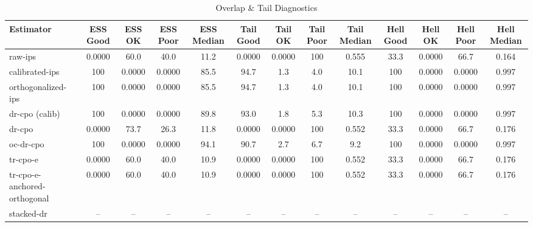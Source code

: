 \begin{table}[htbp]
\centering
\caption{Overlap & Tail Diagnostics}
\label{tab:A3}
\begin{tabular}{l|cccccccccccc}
\toprule
Estimator & ESS Good & ESS OK & ESS Poor & ESS Median & Tail Good & Tail OK & Tail Poor & Tail Median & Hell Good & Hell OK & Hell Poor & Hell Median \\
\midrule
raw-ips & 0.0000 & 60.0 & 40.0 & 11.2 & 0.0000 & 0.0000 & 100 & 0.555 & 33.3 & 0.0000 & 66.7 & 0.164 \\
calibrated-ips & 100 & 0.0000 & 0.0000 & 85.5 & 94.7 & 1.3 & 4.0 & 10.1 & 100 & 0.0000 & 0.0000 & 0.997 \\
orthogonalized-ips & 100 & 0.0000 & 0.0000 & 85.5 & 94.7 & 1.3 & 4.0 & 10.1 & 100 & 0.0000 & 0.0000 & 0.997 \\
dr-cpo (calib) & 100 & 0.0000 & 0.0000 & 89.8 & 93.0 & 1.8 & 5.3 & 10.3 & 100 & 0.0000 & 0.0000 & 0.997 \\
dr-cpo & 0.0000 & 73.7 & 26.3 & 11.8 & 0.0000 & 0.0000 & 100 & 0.552 & 33.3 & 0.0000 & 66.7 & 0.176 \\
oc-dr-cpo & 100 & 0.0000 & 0.0000 & 94.1 & 90.7 & 2.7 & 6.7 & 9.2 & 100 & 0.0000 & 0.0000 & 0.997 \\
tr-cpo-e & 0.0000 & 60.0 & 40.0 & 10.9 & 0.0000 & 0.0000 & 100 & 0.552 & 33.3 & 0.0000 & 66.7 & 0.176 \\
tr-cpo-e-anchored-orthogonal & 0.0000 & 60.0 & 40.0 & 10.9 & 0.0000 & 0.0000 & 100 & 0.552 & 33.3 & 0.0000 & 66.7 & 0.176 \\
stacked-dr & -- & -- & -- & -- & -- & -- & -- & -- & -- & -- & -- & -- \\
\bottomrule
\end{tabular}
\end{table}